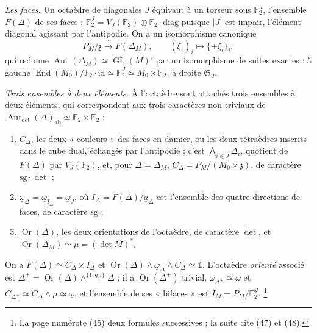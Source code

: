\documentclass[11pt,a4paper]{article}
\begin{document}
\emph{Les faces.} Un octaèdre de diagonales $J$ équivaut à un torseur sous
$\mathbb{F}_2^J$, l'ensemble $F(\Delta)$ de ses faces ;
$\mathbb{F}_2^J = V_J(\mathbb{F}_2) \oplus \mathbb{F}_2 \cdot \mathrm{diag}$
puisque $|J|$ est impair, l'élément diagonal agissant par l'antipodie. On a un
isomorphisme canonique
\[
P_M / \mathfrak{z} \xrightarrow{\;\sim\;} F(\Delta_M), \qquad (\xi_i)_i \longmapsto
\{\pm \xi_i\}_i ,
\]
qui redonne $\operatorname{Aut}(\Delta_M) \simeq \operatorname{GL}(M)'$ par un
isomorphisme de suites exactes : à gauche
$\operatorname{End}(M_0)/\mathbb{F}_2 \cdot \mathrm{id} \simeq \mathbb{F}_2^J
\simeq M_0 \times \mathbb{F}_2$, à droite $\mathfrak{S}_J$.

\emph{Trois ensembles à deux éléments.} À l'octaèdre sont attachés trois
ensembles à deux éléments, qui correspondent aux trois caractères non triviaux
de $\operatorname{Aut}_{\mathrm{oct}}(\Delta)_{\mathrm{ab}} \simeq \mathbb{F}_2
\times \mathbb{F}_2$ :
\begin{enumerate}
\item[--] $C_\Delta$, les deux « couleurs » des faces en damier, ou les deux
tétraèdres inscrits dans le cube dual, échangés par l'antipodie ; c'est
$\bigwedge_{i \in J} \Delta_i$, quotient de $F(\Delta)$ par $V_J(\mathbb{F}_2)$,
et, pour $\Delta = \Delta_M$, $C_\Delta = P_M / (M_0 \times \mathfrak{z})$,
de caractère $\mathrm{sg} \cdot \det$ ;
\item[--] $\underline{\omega}_\Delta = \underline{\omega}_{I_\Delta} =
\underline{\omega}_J$, où $I_\Delta = F(\Delta)/\underline{a}_\Delta$ est
l'ensemble des quatre directions de faces, de caractère $\mathrm{sg}$ ;
\item[--] $\operatorname{Or}(\Delta)$, les deux orientations de l'octaèdre, de
caractère $\det$, et $\operatorname{Or}(\Delta_M) \simeq \mu = (\det M)^{*}$.
\end{enumerate}
On a $F(\Delta) \simeq C_\Delta \times I_\Delta$ et
$\operatorname{Or}(\Delta) \wedge \underline{\omega}_\Delta \wedge C_\Delta
\simeq \mathbb{1}$. L'octaèdre \emph{orienté} associé est
$\Delta^{+} = \operatorname{Or}(\Delta) \wedge^{\{1, \underline{a}_\Delta\}}
\Delta$ ; il a $\operatorname{Or}(\Delta^{+})$ trivial,
$\underline{\omega}_{\Delta^{+}} \simeq \underline{\omega}$ et
$C_{\Delta^{+}} \simeq C_\Delta \wedge \mu \simeq \underline{\omega}$, et
l'ensemble de ses « bifaces » est $I_M = P_M / \mathbb{F}_2^{\underline{\omega}}$.%
\footnote{La page numérote (45) deux formules successives ; la suite cite (47)
et (48).}
\end{document}
